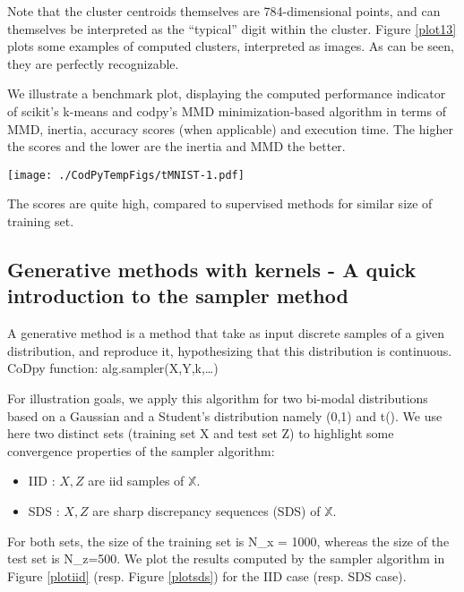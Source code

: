\documentclass[]{article}
\def\({}%
\def\){}%
\numberwithin{equation}{section}
\begin{document}
Note that the cluster centroids themselves are 784-dimensional points,
and can themselves be interpreted as the ``typical'' digit within the
cluster. Figure \ref{plot13} plots some examples of computed clusters,
interpreted as images. As can be seen, they are perfectly recognizable.

We illustrate a benchmark plot, displaying the computed performance
indicator of scikit's k-means and codpy's MMD minimization-based
algorithm in terms of MMD, inertia, accuracy scores (when applicable)
and execution time. The higher the scores and the lower are the inertia
and MMD the better.

\texttt{[image: ./CodPyTempFigs/tMNIST-1.pdf]}

The scores are quite high, compared to supervised methods for similar
size of training set.

\newpage 

\newpage

\subsection{Generative methods with kernels - A quick introduction to
the sampler
method}\label{generative-methods-with-kernels---a-quick-introduction-to-the-sampler-method}

A generative method is a method that take as input discrete samples of a
given distribution, and reproduce it, hypothesizing that this
distribution is continuous. CoDpy function: alg.sampler(X,Y,k,\ldots{})

For illustration goals, we apply this algorithm for two bi-modal
distributions based on a Gaussian and a Student's distribution namely
\((0,1)\) and \(t()\). We use here two distinct sets
(training set \(X\) and test set \(Z\)) to highlight some convergence
properties of the sampler algorithm:

\begin{itemize}\setlength{\itemsep}{0pt}
    \item IID : $X,Z$ are iid samples of $\mathbb{X}$.
    \item SDS : $X,Z$ are sharp discrepancy sequences (SDS) of $\mathbb{X}$.
\end{itemize}

For both sets, the size of the training set is \(N_x = 1000\), whereas
the size of the test set is \(N_z=500\). We plot the results computed by
the sampler algorithm in Figure \ref{plotiid} (resp. Figure
\ref{plotsds}) for the IID case (resp. SDS case).
\end{document}
